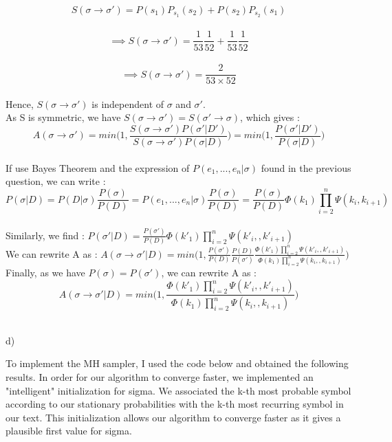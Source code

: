 \documentclass[12pt,a4paper]{report} %
\begin{document}
\[ 
S(\sigma \rightarrow \sigma') = P(s_1)P_{s_1}(s_2)+P(s_2)P_{s_2}(s_1) \] \\
\[ \implies
S(\sigma \rightarrow \sigma') = \frac{1}{53}\frac{1}{52} + \frac{1}{53}\frac{1}{52} \] \\
\[ \implies
S(\sigma \rightarrow \sigma') = \frac{2}{53\times52}\] \\
Hence, $S(\sigma \rightarrow \sigma')$  is independent of $\sigma$ and $\sigma'$.
\\

As S is symmetric, we have $S(\sigma \rightarrow \sigma') = S(\sigma' \rightarrow \sigma)$, which gives : \\
\[ 
A(\sigma \rightarrow \sigma') = min\big(1, \frac{S(\sigma \rightarrow \sigma') P(\sigma' \vert D')}{S(\sigma \rightarrow \sigma') P(\sigma \vert D)} \big)= min\big(1, \frac{ P(\sigma' \vert D')}{P(\sigma \vert D)} \big)
\] \\

If use Bayes Theorem and the expression of $P(e_1, ..., e_n \vert \sigma)$ found in the previous question, we can write : \\
\[ 
P(\sigma \vert D) = P(D \vert \sigma)\frac{P(\sigma)}{P(D)}= P(e_1, ..., e_n \vert \sigma)\frac{P(\sigma)}{P(D)}= \frac{P(\sigma)}{P(D)}\Phi(k_1)\prod_{i=2}^{n}\Psi(k_i, k_{i+1}) \] \\

Similarly, we find :
$
P(\sigma' \vert D) = \frac{P(\sigma')}{P(D)}\Phi(k'_1)\prod_{i=2}^{n}\Psi(k'_i, ,k'_{i + 1})
$ \\

We can rewrite A as : $
A(\sigma \rightarrow \sigma' \vert D) = min\big(1, \frac{P(\sigma')}{P(D)}\frac{P(D)}{P(\sigma')}\frac{\Phi(k'_1)\prod_{i=2}^{n}\Psi(k'_i, ,k'_{i + 1})}{\Phi(k_1)\prod_{i=2}^{n}\Psi(k_i, ,k_{i + 1})}\big)
$\\

Finally, as we have $P(\sigma)=P(\sigma')$, we can rewrite A as :\\
\[ 
A(\sigma \rightarrow \sigma' \vert D) = min\big(1, \frac{\Phi(k'_1)\prod_{i=2}^{n}\Psi(k'_i, ,k'_{i + 1})}{\Phi(k_1)\prod_{i=2}^{n}\Psi(k_i, ,k_{i + 1})}\big)
\] \\

\item d)

To implement the MH sampler, I used the code below and obtained the following results. In order for our algorithm to converge faster, we implemented an "intelligent" initialization for sigma.  We associated the k-th most probable symbol according to our stationary probabilities with the k-th most recurring symbol in our text. This initialization allows our algorithm to converge faster as it gives a plausible first value for sigma. \\
\end{document}
